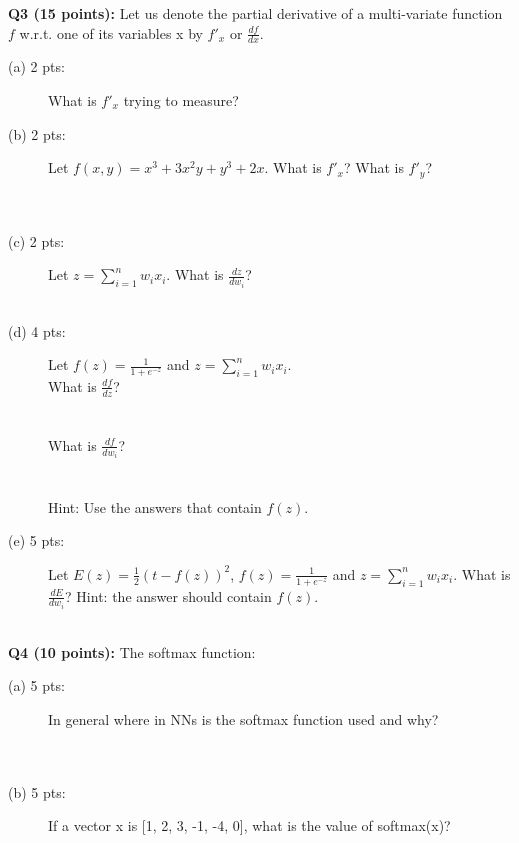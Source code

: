 \documentclass[11pt]{article}
\begin{document}
\vspace{0.4 in}
\hspace{-0.3in}
       {\bf Q3 (15 points):} Let us denote the partial derivative of a
       multi-variate function $f$ w.r.t. one of its variables x by
       $f'_x$ or $\frac{df}{dx}$.         
\begin{description}
\item [(a) 2 pts:] What is $f'_x$ trying to measure? \\
\item [(b) 2 pts:] Let $f(x,y)=x^3 + 3x^2y+y^3 + 2x$. What is $f'_x$?
  What is $f'_y$? \\ \\  \\
\item [(c) 2 pts:] Let $z = \sum_{i=1}^n w_i x_i$.
  What is $\frac{dz}{dw_i}$? \\ \\
  
\item [(d) 4 pts:] Let $f(z)=\frac{1}{1+e^{-z}}$ and $z = \sum_{i=1}^n w_i x_i$. \\
       What is $\frac{df}{dz}$? \\ \\ \\ 
       What is $\frac{df}{dw_i}$? \\ \\ \\
       Hint: Use the answers that contain $f(z)$.

\item [(e) 5 pts:] Let $E(z)=\frac{1}{2}(t - f(z))^2$,
       $f(z)=\frac{1}{1+e^{-z}}$ and $z = \sum_{i=1}^n w_i x_i$.
  What is $\frac{dE}{dw_i}$? Hint: the answer should contain $f(z)$. \\ \\
\end{description}


  
\vspace{0.4 in}
\hspace{-0.3in}
{\bf Q4 (10 points):} The softmax function:
\begin{description}
\item [(a) 5 pts:] In general where in NNs is the softmax function used and why? \\ \\ \\

\item [(b) 5 pts:] If a vector x is [1, 2, 3, -1, -4, 0], what is the value of
  softmax(x)? \\ \\ \\ 
\end{description}
 
\end{document}
